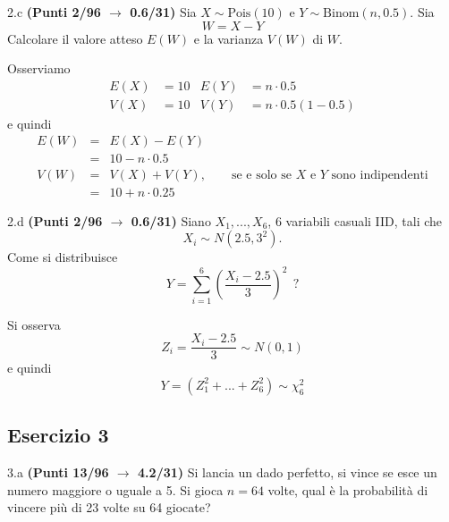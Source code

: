 \documentclass[
  11pt,
]{book}
\theoremstyle{mytheoremstyle}
\theoremstyle{mydefstyle}
\newenvironment{sol}
  {
  \begin{tcolorbox}[enhanced,breakable,arc=0.1mm,boxrule=1pt,colback=white,colframe=iblue,
  title=\bf \fontfamily{lmss}\selectfont \hspace{.5 cm} Soluzione,drop fuzzy shadow]

}{
\end{tcolorbox}
  }
\begin{document}
2.c \textbf{(Punti 2/96 \(\rightarrow\) 0.6/31)} Sia \(X\sim \text{Pois}(10)\) e \(Y\sim\text{Binom}(n,0.5)\).
Sia
\[
W=X-Y
\]
Calcolare il valore atteso \(E(W)\) e la varianza \(V(W)\) di \(W\).

\begin{sol}
Osserviamo
\begin{align*}
E(X)&=10 &E(Y)&=n\cdot 0.5\\
V(X)&=10 &V(Y)&=n\cdot0.5(1-0.5)
\end{align*}
e quindi
\begin{eqnarray*}
E(W)&=&E(X)-E(Y)\\
&=&10-n\cdot 0.5\\
V(W)&=&V(X)+V(Y),\qquad\text{se e solo se $X$ e $Y$ sono indipendenti}\\
&=&10+n\cdot 0.25
\end{eqnarray*}

\end{sol}

2.d \textbf{(Punti 2/96 \(\rightarrow\) 0.6/31)} Siano \(X_1,...,X_6\), \(6\) variabili casuali IID,
tali che
\[
X_i\sim N\left(2.5,3^2\right).
\]
Come si distribuisce
\[
Y=\sum_{i=1}^6\left(\frac{X_i-2.5}{3}\right)^2~~?
\]

\begin{sol}
Si osserva
\[
Z_i=\frac{X_i-2.5}{3}\sim N(0,1)
\]
e quindi
\[
Y=(Z_1^2+...+Z_6^2)\sim\chi_6^2
\]

\end{sol}

\subsection{Esercizio 3}\label{esercizio-3-4}

3.a \textbf{(Punti 13/96 \(\rightarrow\) 4.2/31)} Si lancia un dado perfetto, si vince se esce un numero maggiore o uguale a 5.
Si gioca \(n=64\) volte, qual è la probabilità di vincere più di 23 volte su 64 giocate?
\end{document}
